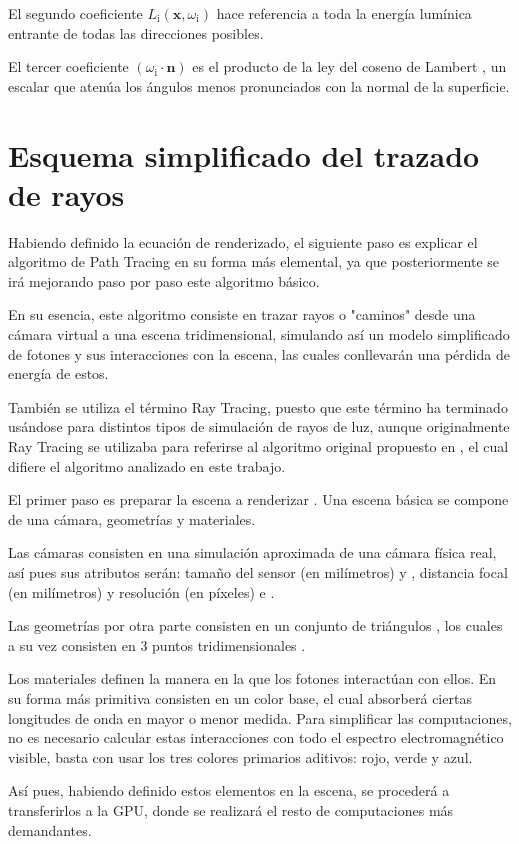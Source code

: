 El segundo coeficiente $L_{\text{i}}(\mathbf {x} ,\omega _{\text{i}})$ hace referencia a toda la energía lumínica entrante de todas las direcciones posibles.

El tercer coeficiente $(\omega _{\text{i}}\cdot \mathbf {n})$ es el producto de la ley del coseno de Lambert \cite{photometria}, un escalar que atenúa los ángulos menos pronunciados con la normal de la superficie.


	\section{Esquema simplificado del trazado de rayos}
	
Habiendo definido la ecuación de renderizado, el siguiente paso es explicar el algoritmo de Path Tracing en su forma más elemental, ya que posteriormente se irá mejorando paso por paso este algoritmo básico.

En su esencia, este algoritmo consiste en trazar rayos o "caminos" desde una cámara virtual a una escena tridimensional, simulando así un modelo simplificado de fotones y sus interacciones con la escena, las cuales conllevarán una pérdida de energía de estos.


También se utiliza el término Ray Tracing, puesto que este término ha terminado usándose para distintos tipos de simulación de rayos de luz, aunque originalmente Ray Tracing se utilizaba para referirse al algoritmo original propuesto en , el cual difiere el algoritmo analizado en este trabajo. 


El primer paso es preparar la escena a renderizar . Una escena básica se compone de una cámara, geometrías y materiales.

Las cámaras  consisten en una simulación aproximada de una cámara física real, así pues sus atributos serán: tamaño del sensor (en milímetros)  y , distancia focal (en milímetros)  y resolución (en píxeles)  e . 

Las geometrías  por otra parte consisten en un conjunto de triángulos , los cuales a su vez consisten en 3 puntos tridimensionales .

Los materiales  definen la manera en la que los fotones interactúan con ellos. En su forma más primitiva consisten en un color base, el cual absorberá ciertas longitudes de onda en mayor o menor medida. Para simplificar las computaciones, no es necesario calcular estas interacciones con todo el espectro electromagnético visible, basta con usar los tres colores primarios aditivos: rojo, verde y azul.


Así pues, habiendo definido estos elementos en la escena, se procederá a transferirlos a la GPU, donde se realizará el resto de computaciones más demandantes. 













	










